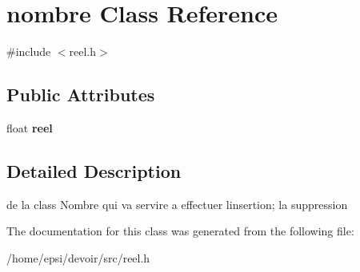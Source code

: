 \hypertarget{classnombre}{}\section{nombre Class Reference}
\label{classnombre}


{\ttfamily \#include $<$reel.\+h$>$}

\subsection*{Public Attributes}
\begin{DoxyCompactItemize}
\item 
\mbox{\label{classnombre_a2bbed2fdc428992bdf023ca8cb37edd7}} 
float {\bfseries reel}
\end{DoxyCompactItemize}


\subsection{Detailed Description}
de la class Nombre qui va servire a effectuer l\textquotesingle{}insertion; la suppression 

The documentation for this class was generated from the following file\+:\begin{DoxyCompactItemize}
\item 
/home/epsi/devoir/src/reel.\+h\end{DoxyCompactItemize}
